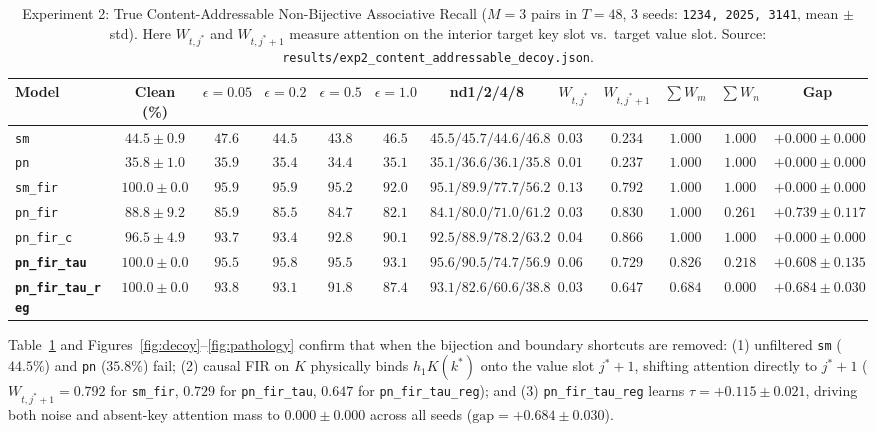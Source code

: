 \documentclass[11pt,a4paper]{article}
\begin{document}
\begin{table}[ht!]
\centering
\caption{Experiment 2: True Content-Addressable Non-Bijective Associative Recall ($M=3$ pairs in $T=48$, 3 seeds: \texttt{1234, 2025, 3141}, mean $\pm$ std). Here $W_{t, j^*}$ and $W_{t, j^*+1}$ measure attention on the interior target key slot vs.\ target value slot. Source: \texttt{results/exp2\_content\_addressable\_decoy.json}.}
\label{tab:exp2}
\scriptsize
\setlength{\tabcolsep}{1.6pt}
\begin{tabular}{lccccccccccc}
\toprule
Model & Clean (\%) & $\epsilon{=}0.05$ & $\epsilon{=}0.2$ & $\epsilon{=}0.5$ & $\epsilon{=}1.0$ & nd1/2/4/8 & $W_{t, j^*}$ & $W_{t, j^*+1}$ & $\sum W_m$ & $\sum W_n$ & Gap \\
\midrule
\texttt{sm} & $44.5 \pm 0.9$ & $47.6$ & $44.5$ & $43.8$ & $46.5$ & $45.5 / 45.7 / 44.6 / 46.8$ & $0.035$ & $0.234$ & $1.000$ & $1.000$ & $+0.000 \pm 0.000$ \\
\texttt{pn} & $35.8 \pm 1.0$ & $35.9$ & $35.4$ & $34.4$ & $35.1$ & $35.1 / 36.6 / 36.1 / 35.8$ & $0.015$ & $0.237$ & $1.000$ & $1.000$ & $+0.000 \pm 0.000$ \\
\texttt{sm\_fir} & $\mathbf{100.0 \pm 0.0}$ & $\mathbf{95.9}$ & $\mathbf{95.9}$ & $95.2$ & $92.0$ & $95.1 / 89.9 / 77.7 / 56.2$ & $0.132$ & $\mathbf{0.792}$ & $1.000$ & $1.000$ & $+0.000 \pm 0.000$ \\
\texttt{pn\_fir} & $88.8 \pm 9.2$ & $85.9$ & $85.5$ & $84.7$ & $82.1$ & $84.1 / 80.0 / 71.0 / 61.2$ & $0.032$ & $0.830$ & $1.000$ & $0.261$ & $+0.739 \pm 0.117$ \\
\texttt{pn\_fir\_c} & $96.5 \pm 4.9$ & $93.7$ & $93.4$ & $92.8$ & $90.1$ & $92.5 / 88.9 / 78.2 / 63.2$ & $0.044$ & $0.866$ & $1.000$ & $1.000$ & $+0.000 \pm 0.000$ \\
\textbf{\texttt{pn\_fir\_tau}} & $\mathbf{100.0 \pm 0.0}$ & $95.5$ & $\mathbf{95.8}$ & $\mathbf{95.5}$ & $\mathbf{93.1}$ & $\mathbf{95.6 / 90.5 / 74.7 / 56.9}$ & $0.063$ & $\mathbf{0.729}$ & $0.826$ & $0.218$ & $+0.608 \pm 0.135$ \\
\textbf{\texttt{pn\_fir\_tau\_reg}} & $\mathbf{100.0 \pm 0.0}$ & $93.8$ & $93.1$ & $91.8$ & $87.4$ & $93.1 / 82.6 / 60.6 / 38.8$ & $0.034$ & $\mathbf{0.647}$ & $0.684$ & $\mathbf{0.000}$ & $\mathbf{+0.684 \pm 0.030}$ \\
\bottomrule
\end{tabular}
\end{table}

Table~\ref{tab:exp2} and Figures~\ref{fig:decoy}--\ref{fig:pathology} confirm that when the bijection and boundary shortcuts are removed: (1) unfiltered \texttt{sm} ($44.5\%$) and \texttt{pn} ($35.8\%$) fail; (2) causal FIR on $K$ physically binds $h_1 K(k^*)$ onto the value slot $j^*+1$, shifting attention directly to $j^*+1$ ($W_{t, j^*+1} = 0.792$ for \texttt{sm\_fir}, $0.729$ for \texttt{pn\_fir\_tau}, $0.647$ for \texttt{pn\_fir\_tau\_reg}); and (3) \texttt{pn\_fir\_tau\_reg} learns $\tau = +0.115 \pm 0.021$, driving both noise and absent-key attention mass to $0.000 \pm 0.000$ across all seeds ($\text{gap} = +0.684 \pm 0.030$).
\end{document}
